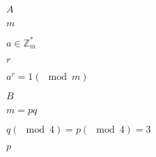 \documentclass[10pt]{book}
\begin{document}
\begin{mdSnippets}

\newcommand{\zo}{\{0,1\}}
\newcommand{\E}{\mathbb{E}}
\newcommand{\Z}{\mathbb{Z}}
\newcommand{\getsr}{\leftarrow_R\;}
\newcommand{\Gp}{\mathbb{G}}
\newcommand{\iprod}[1]{\langle #1 \rangle}
\newcommand{\Epubcca}{E^{pub,cca}}
\newcommand{\Epubcpa}{E^{pub,cpa}}
\newcommand{\Epriv}{E^{priv,cca}}
\newcommand{\Sign}{S}
\newcommand{\Ver}{V}

\newcommand{\floor}[1]{\lfloor #1 \rfloor}
\newcommand{\ceil}[1]{\lceil #1 \rceil}

\newcommand{\cF}{\mathcal{F}}

\newcommand{\onand}{\overline{\wedge}}

\begin{mdInlineSnippet}[7fc56270e7a70fa81a5935b72eacbe29]%
$A$\end{mdInlineSnippet}%
\begin{mdInlineSnippet}[6f8f57715090da2632453988d9a1501b]%
$m$\end{mdInlineSnippet}%
\begin{mdInlineSnippet}[9f4809a498f791e149c15acf36016f4e]%
$a \in \Z^*_m$\end{mdInlineSnippet}%
\begin{mdInlineSnippet}[4b43b0aee35624cd95b910189b3dc231]%
$r$\end{mdInlineSnippet}%
\begin{mdInlineSnippet}%
$a^r = 1 (\mod m)$\end{mdInlineSnippet}%
\begin{mdInlineSnippet}%
$B$\end{mdInlineSnippet}%
\begin{mdInlineSnippet}[824b820a39c9c7d649958fe8740719b9]%
$m=pq$\end{mdInlineSnippet}%
\begin{mdInlineSnippet}[fa38a8e0c60c09133cb6acc68da08074]%
$q (\mod 4) = p (\mod 4)=3$\end{mdInlineSnippet}%
\begin{mdInlineSnippet}[83878c91171338902e0fe0fb97a8c47a]%
$p$\end{mdInlineSnippet}%

\end{mdSnippets}
\end{document}
